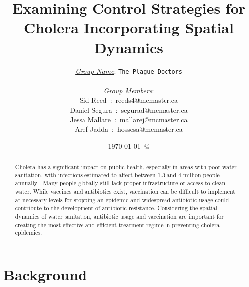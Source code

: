 \documentclass[12pt]{article}\usepackage[]{graphicx}\usepackage[]{color}
\begin{document}
\title{Examining Control Strategies for Cholera Incorporating Spatial Dynamics}
\author{
\underline{\emph{Group Name}}: \texttt{{\color{blue}The Plague Doctors}}\\\\
\underline{\emph{Group Members}}:\\
         Sid Reed\ :\ {\color{blue}reeds4@mcmaster.ca}\\
         Daniel Segura\ :\ {\color{blue}segurad@mcmaster.ca}\\
         Jessa Mallare\ :\ {\color{blue}mallarej@mcmaster.ca}\\
         Aref Jadda\ :\ {\color{blue}hossesa@mcmaster.ca}\\
}
\date{\today\ @ \thistime}
\maketitle

\begin{abstract}
    Cholera has a significant impact on public health, especially in areas with poor water sanitation, with infections estimated to affect between 1.3 and 4 million people annually \citep{link18}.
    Many people globally still lack proper infrastructure or access to clean water\citep{link19}.
    While vaccines and antibiotics exist, vaccination can be difficult to implement at necessary levels for stopping an epidemic and widespread antibiotic usage could contribute to the development of antibiotic resistance.
    Considering the spatial dynamics of water sanitation, antibiotic usage and vaccination are important for creating the most effective and efficient treatment regime in preventing cholera epidemics.
\end{abstract}

\clearpage
\tableofcontents
\clearpage

\section{Background}
\end{document}
